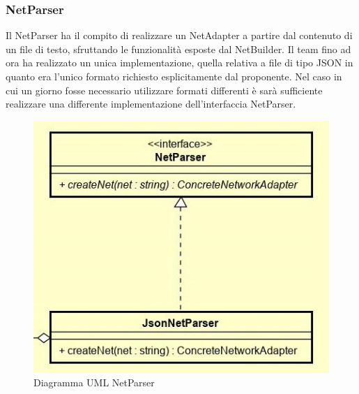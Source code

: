\subsubsection{NetParser}
Il NetParser ha il compito di realizzare un NetAdapter a partire dal contenuto di un file di testo, sfruttando le funzionalità esposte dal NetBuilder.
Il team fino ad ora ha realizzato un unica implementazione, quella relativa a file di tipo JSON in quanto era l'unico formato richiesto esplicitamente dal proponente.
Nel caso in cui un giorno fosse necessario utilizzare formati differenti è sarà sufficiente realizzare una differente implementazione dell'interfaccia NetParser.
\begin{figure} [H]
	\centering
	\includegraphics[scale=1]{Img/NetParser}
	\caption{Diagramma UML NetParser}\label{}
\end{figure}
